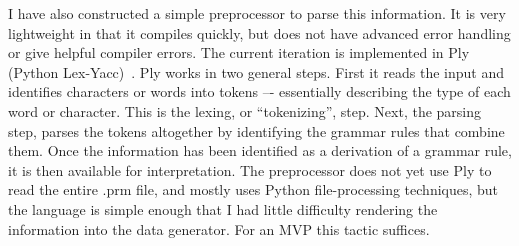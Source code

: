 I have also constructed a simple preprocessor to parse this information. It is very lightweight in that it compiles quickly, but does not have advanced error handling or give helpful compiler errors. The current iteration is implemented in Ply (Python Lex-Yacc)~\cite{PythonLexYacc}. Ply works in two general steps. First it reads the input and identifies characters or words into tokens –- essentially describing the type of each word or character. This is the lexing, or ``tokenizing'', step. Next, the parsing step, parses the tokens altogether by identifying the grammar rules that combine them. Once the information has been identified as a derivation of a grammar rule, it is then available for interpretation. The preprocessor does not yet use Ply to read the entire .prm file, and mostly uses Python file-processing techniques, but the language is simple enough that I had little difficulty rendering the information into the data generator. For an MVP this tactic suffices.
